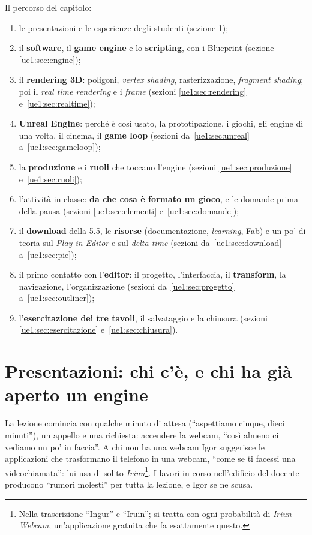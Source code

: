 Il percorso del capitolo:
\begin{enumerate}
  \item le presentazioni e le esperienze degli studenti (sezione
        \ref{ue1:sec:presentazioni});
  \item il \textbf{software}, il \textbf{game engine} e lo \textbf{scripting}, con i
        Blueprint (sezione \ref{ue1:sec:engine});
  \item il \textbf{rendering 3D}: poligoni, \emph{vertex shading}, rasterizzazione,
        \emph{fragment shading}; poi il \emph{real time rendering} e i \emph{frame}
        (sezioni \ref{ue1:sec:rendering} e~\ref{ue1:sec:realtime});
  \item \textbf{Unreal Engine}: perché è così usato, la prototipazione, i giochi, gli
        engine di una volta, il cinema, il \textbf{game loop} (sezioni
        da~\ref{ue1:sec:unreal} a~\ref{ue1:sec:gameloop});
  \item la \textbf{produzione} e i \textbf{ruoli} che toccano l'engine (sezioni
        \ref{ue1:sec:produzione} e~\ref{ue1:sec:ruoli});
  \item l'attività in classe: \textbf{da che cosa è formato un gioco}, e le domande
        prima della pausa (sezioni \ref{ue1:sec:elementi} e~\ref{ue1:sec:domande});
  \item il \textbf{download} della 5.5, le \textbf{risorse} (documentazione,
        \emph{learning}, Fab) e un po' di teoria sul \emph{Play in Editor} e sul
        \emph{delta time} (sezioni da~\ref{ue1:sec:download} a~\ref{ue1:sec:pie});
  \item il primo contatto con l'\textbf{editor}: il progetto, l'interfaccia, il
        \textbf{transform}, la navigazione, l'organizzazione (sezioni
        da~\ref{ue1:sec:progetto} a~\ref{ue1:sec:outliner});
  \item l'\textbf{esercitazione dei tre tavoli}, il salvataggio e la chiusura (sezioni
        \ref{ue1:sec:esercitazione} e~\ref{ue1:sec:chiusura}).
\end{enumerate}

\section{Presentazioni: chi c'è, e chi ha già aperto un engine}
\label{ue1:sec:presentazioni}

La lezione comincia con qualche minuto di attesa (``aspettiamo cinque, dieci minuti''),
un appello e una richiesta: accendere la webcam, ``così almeno ci vediamo un po' in
faccia''. A chi non ha una webcam Igor suggerisce le applicazioni che trasformano il
telefono in una webcam, ``come se ti facessi una videochiamata'': lui usa di solito
\emph{Iriun}\footnote{Nella trascrizione ``Ingur'' e ``Iruin''; si tratta con ogni
probabilità di \emph{Iriun Webcam}, un'applicazione gratuita che fa esattamente
questo.}. I lavori in corso nell'edificio del docente producono ``rumori molesti'' per
tutta la lezione, e Igor se ne scusa.

